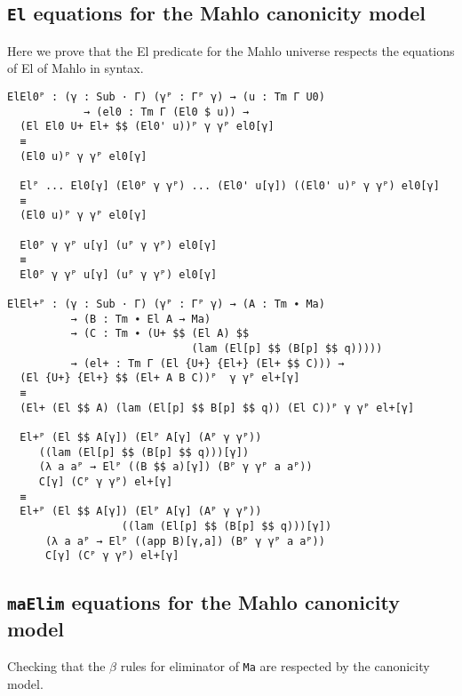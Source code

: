 \subsection{\texttt{El} equations for the Mahlo canonicity model}

Here we prove that the El predicate for the Mahlo universe respects the equations of El of Mahlo in syntax.

\begin{verbatim}
ElEl0ᴾ : (γ : Sub · Γ) (γᴾ : Γᴾ γ) → (u : Tm Γ U0)
            → (el0 : Tm Γ (El0 $ u)) →
  (El El0 U+ El+ $$ (El0' u))ᴾ γ γᴾ el0[γ]
  ≡
  (El0 u)ᴾ γ γᴾ el0[γ]

  Elᴾ ... El0[γ] (El0ᴾ γ γᴾ) ... (El0' u[γ]) ((El0' u)ᴾ γ γᴾ) el0[γ]
  ≡
  (El0 u)ᴾ γ γᴾ el0[γ]

  El0ᴾ γ γᴾ u[γ] (uᴾ γ γᴾ) el0[γ]
  ≡
  El0ᴾ γ γᴾ u[γ] (uᴾ γ γᴾ) el0[γ]

ElEl+ᴾ : (γ : Sub · Γ) (γᴾ : Γᴾ γ) → (A : Tm ∙ Ma)
          → (B : Tm ∙ El A → Ma)
          → (C : Tm ∙ (U+ $$ (El A) $$
                             (lam (El[p] $$ (B[p] $$ q)))))
          → (el+ : Tm Γ (El {U+} {El+} (El+ $$ C))) →
  (El {U+} {El+} $$ (El+ A B C))ᴾ  γ γᴾ el+[γ]
  ≡
  (El+ (El $$ A) (lam (El[p] $$ B[p] $$ q)) (El C))ᴾ γ γᴾ el+[γ]

  El+ᴾ (El $$ A[γ]) (Elᴾ A[γ] (Aᴾ γ γᴾ))
     ((lam (El[p] $$ (B[p] $$ q)))[γ])
     (λ a aᴾ → Elᴾ ((B $$ a)[γ]) (Bᴾ γ γᴾ a aᴾ))
     C[γ] (Cᴾ γ γᴾ) el+[γ]
  ≡
  El+ᴾ (El $$ A[γ]) (Elᴾ A[γ] (Aᴾ γ γᴾ))
                  ((lam (El[p] $$ (B[p] $$ q)))[γ])
      (λ a aᴾ → Elᴾ ((app B)[γ,a]) (Bᴾ γ γᴾ a aᴾ))
      C[γ] (Cᴾ γ γᴾ) el+[γ]
\end{verbatim}

\subsection{\texttt{maElim} equations for the Mahlo canonicity model}

Checking that the $\beta$ rules for eliminator of \texttt{Ma} are respected by the canonicity model.

